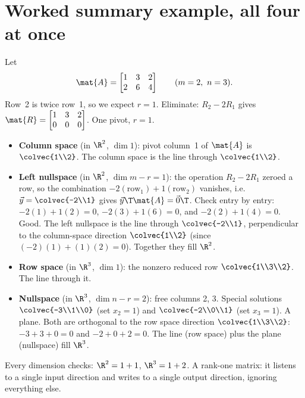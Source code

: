 \section{Worked summary example, all four at once}

\begin{example}\label{ch15:full-worked}
Let
\[
  \mat{A} = \begin{bmatrix} 1 & 3 & 2\\ 2 & 6 & 4 \end{bmatrix}
  \qquad (m=2,\ n=3).
\]
Row~2 is twice row~1, so we expect $r=1$. Eliminate: $R_2-2R_1$ gives
$\mat{R}=\begin{bmatrix}1&3&2\\0&0&0\end{bmatrix}$. One pivot, $r=1$.
\begin{itemize}
  \item \textbf{Column space} (in $\R^2$, $\dim 1$): pivot column~1 of $\mat{A}$ is
  $\colvec{1\\2}$. The column space is the line through $\colvec{1\\2}$.
  \item \textbf{Left nullspace} (in $\R^2$, $\dim m-r=1$): the operation $R_2-2R_1$ zeroed a row,
  so the combination $-2(\text{row}_1)+1(\text{row}_2)$ vanishes, i.e. $\vec{y}=\colvec{-2\\1}$
  gives $\vec{y}\T\mat{A}=\vec{0}\T$. Check entry by entry: $-2(1)+1(2)=0$, $-2(3)+1(6)=0$, and
  $-2(2)+1(4)=0$. Good. The left nullspace is the line through $\colvec{-2\\1}$, perpendicular to
  the column-space direction $\colvec{1\\2}$ (since $(-2)(1)+(1)(2)=0$). Together they fill
  $\R^2$.
  \item \textbf{Row space} (in $\R^3$, $\dim 1$): the nonzero reduced row $\colvec{1\\3\\2}$. The
  line through it.
  \item \textbf{Nullspace} (in $\R^3$, $\dim n-r=2$): free columns 2, 3. Special solutions
  $\colvec{-3\\1\\0}$ (set $x_2=1$) and $\colvec{-2\\0\\1}$ (set $x_3=1$). A plane. Both are
  orthogonal to the row space direction $\colvec{1\\3\\2}$: $-3+3+0=0$ and $-2+0+2=0$. The line
  (row space) plus the plane (nullspace) fill $\R^3$.
  \end{itemize}
Every dimension checks: $\R^2 = 1 + 1$, $\R^3 = 1 + 2$. A rank-one matrix: it listens to a single
input direction and writes to a single output direction, ignoring everything else.
\end{example}

